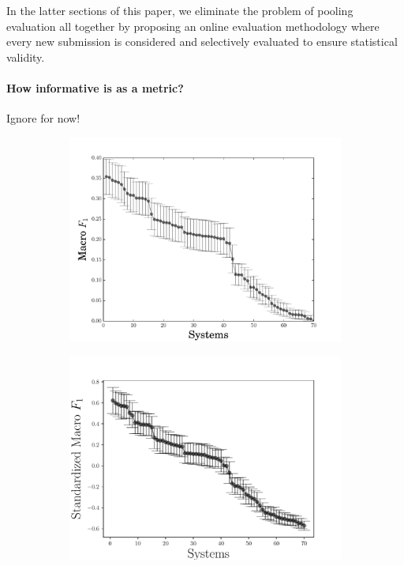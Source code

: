 In the latter sections of this paper, we eliminate the problem of pooling evaluation all together by proposing an online evaluation methodology where every new submission is considered and selectively evaluated to ensure statistical validity.

\paragraph{How informative is \fone{} as a metric?}
\ac{Ignore for now!}
\begin{figure}
  \begin{subfigure}{0.49\textwidth}
  \includegraphics[width=\columnwidth]{figures/experiment1}
  \caption{\label{fig:f1}}
  \end{subfigure}
  \begin{subfigure}{0.49\textwidth}
  \includegraphics[width=\columnwidth]{figures/experiment3}
  \caption{\label{fig:sf1}}
  \end{subfigure}
  \caption{}
\end{figure}

